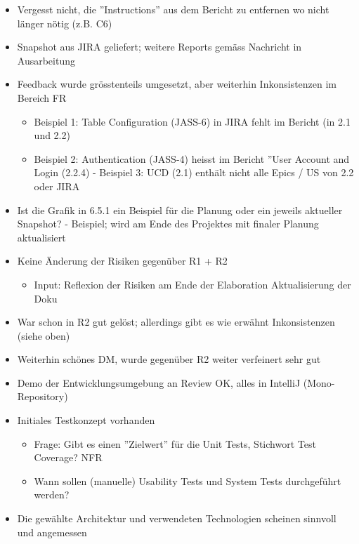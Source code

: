 \begin{itemize}
    \item Vergesst nicht, die ''Instructions'' aus dem Bericht zu entfernen wo nicht länger nötig (z.B. C6)
    \item Snapshot aus JIRA geliefert; weitere Reports gemäss Nachricht in Ausarbeitung
    \item Feedback wurde grösstenteils umgesetzt, aber weiterhin Inkonsistenzen im Bereich FR
    \begin{itemize}
        \item Beispiel 1: Table Configuration (JASS-6) in JIRA fehlt im Bericht (in 2.1 und 2.2)
        \item Beispiel 2: Authentication (JASS-4) heisst im Bericht ''User Account and Login (2.2.4) - Beispiel 3: UCD (2.1) enthält nicht alle Epics / US von 2.2 oder JIRA
    \end{itemize}
    \item Ist die Grafik in 6.5.1 ein Beispiel für die Planung oder ein jeweils aktueller Snapshot? - Beispiel; wird am Ende des Projektes mit finaler Planung aktualisiert
    \item Keine Änderung der Risiken gegenüber R1 + R2
    \begin{itemize}
        \item Input: Reflexion der Risiken am Ende der Elaboration \textrightarrow Aktualisierung der Doku
    \end{itemize}
    \item War schon in R2 gut gelöst; allerdings gibt es wie erwähnt Inkonsistenzen (siehe oben)
    \item Weiterhin schönes DM, wurde gegenüber R2 weiter verfeinert \textrightarrow sehr gut
    \item Demo der Entwicklungsumgebung an Review \textrightarrow OK, alles in IntelliJ (Mono-Repository)
    \item Initiales Testkonzept vorhanden
    \begin{itemize}
        \item Frage: Gibt es einen ''Zielwert'' für die Unit Tests, Stichwort Test Coverage? \textrightarrow NFR
        \item Wann sollen (manuelle) Usability Tests und System Tests durchgeführt werden?
    \end{itemize}
    \item Die gewählte Architektur und verwendeten Technologien scheinen sinnvoll und angemessen
    \begin{itemize}

\end{itemize}
\end{itemize}

